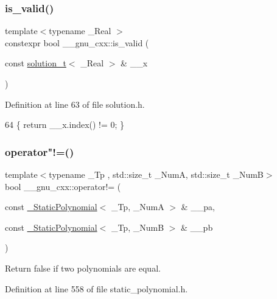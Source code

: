\subsubsection{\texorpdfstring{is\+\_\+valid()}{is\_valid()}}
{\footnotesize\ttfamily template$<$typename \+\_\+\+Real $>$ \\
constexpr bool \+\_\+\+\_\+gnu\+\_\+cxx\+::is\+\_\+valid (\begin{DoxyParamCaption}\item[{const \hyperlink{namespace____gnu__cxx_ae20ea642de50eb361074c62676b0159c}{solution\+\_\+t}$<$ \+\_\+\+Real $>$ \&}]{\+\_\+\+\_\+x }\end{DoxyParamCaption})}



Definition at line 63 of file solution.\+h.


\begin{DoxyCode}
64     \{ \textcolor{keywordflow}{return} \_\_x.index() != 0; \}
\end{DoxyCode}
\mbox{\label{namespace____gnu__cxx_ad79bae6336788c58358fcf9fcd342cb9}} 
\subsubsection{\texorpdfstring{operator"!=()}{operator!=()}\hspace{0.1cm}{\footnotesize\ttfamily [1/3]}}
{\footnotesize\ttfamily template$<$typename \+\_\+\+Tp , std\+::size\+\_\+t \+\_\+\+NumA, std\+::size\+\_\+t \+\_\+\+NumB$>$ \\
bool \+\_\+\+\_\+gnu\+\_\+cxx\+::operator!= (\begin{DoxyParamCaption}\item[{const \hyperlink{class____gnu__cxx_1_1__StaticPolynomial}{\+\_\+\+Static\+Polynomial}$<$ \+\_\+\+Tp, \+\_\+\+NumA $>$ \&}]{\+\_\+\+\_\+pa,  }\item[{const \hyperlink{class____gnu__cxx_1_1__StaticPolynomial}{\+\_\+\+Static\+Polynomial}$<$ \+\_\+\+Tp, \+\_\+\+NumB $>$ \&}]{\+\_\+\+\_\+pb }\end{DoxyParamCaption})\hspace{0.3cm}{\ttfamily [inline]}}

Return false if two polynomials are equal. 

Definition at line 558 of file static\+\_\+polynomial.\+h.


